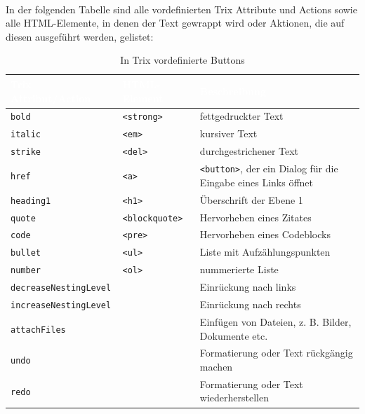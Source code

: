 \mbox{}\\
In der folgenden Tabelle sind alle vordefinierten Trix Attribute und Actions sowie alle HTML-Elemente, in denen der Text gewrappt wird oder Aktionen, die auf diesen ausgeführt werden, gelistet:

\begin{table}[H]
	\begin{center}
	\begin{tabularx}{\textwidth}{| p{4cm} | l | X |}
		\hline
		\cellcolor{Gray}\textcolor{White}{Trix Attribut/Action} & \cellcolor{Gray}\textcolor{White}{HTML-Element} & \cellcolor{Gray}\textcolor{White}{Beschreibung} \\
		\hline
		\hline
		\texttt{bold} & \texttt{<strong>} & fettgedruckter Text\\
		\hline
		\texttt{italic} & \texttt{<em>} & kursiver Text\\
		\hline
		\texttt{strike} & \texttt{<del>} & durchgestrichener Text\\
		\hline
		\texttt{href} & \texttt{<a>} & \texttt{<button>}, der ein Dialog für die Eingabe eines Links öffnet\\
		\hline
		\texttt{heading1} & \texttt{<h1>} & Überschrift der Ebene 1\\
		\hline
		\texttt{quote} & \texttt{<blockquote>} & Hervorheben eines Zitates\\
		\hline
		\texttt{code} & \texttt{<pre>} & Hervorheben eines Codeblocks\\
		\hline
		\texttt{bullet} & \texttt{<ul>} & Liste mit Aufzählungspunkten\\
		\hline
		\texttt{number} & \texttt{<ol>} & nummerierte Liste\\
		\hline
		\texttt{decreaseNestingLevel} & & Einrückung nach links\\
		\hline
		\texttt{increaseNestingLevel} & & Einrückung nach rechts\\
		\hline
		\texttt{attachFiles} & & Einfügen von Dateien, z. B. Bilder, Dokumente etc.\\
		\hline
		\texttt{undo} & & Formatierung oder Text rückgängig machen\\
		\hline
		\texttt{redo} & & Formatierung oder Text wiederherstellen\\
		\hline
	\end{tabularx}
	\end{center}
	\caption{In Trix vordefinierte Buttons}
	\label{table:trix_supported_tags}
\end{table}

